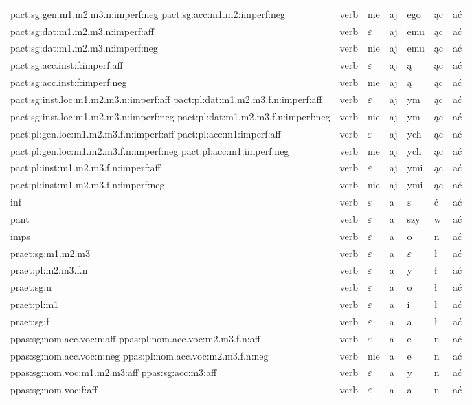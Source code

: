 \documentclass{article}
\begin{document}
\begin{longtable}{p{7cm}|l|l|l|l|l|l}
pact:sg:gen:m1.m2.m3.n:imperf:neg pact:sg:acc:m1.m2:imperf:neg & verb & nie & aj & ego & ąc & ać\\
pact:sg:dat:m1.m2.m3.n:imperf:aff & verb & $\varepsilon$ & aj & emu & ąc & ać\\
pact:sg:dat:m1.m2.m3.n:imperf:neg & verb & nie & aj & emu & ąc & ać\\
pact:sg:acc.inst:f:imperf:aff & verb & $\varepsilon$ & aj & ą & ąc & ać\\
pact:sg:acc.inst:f:imperf:neg & verb & nie & aj & ą & ąc & ać\\
pact:sg:inst.loc:m1.m2.m3.n:imperf:aff pact:pl:dat:m1.m2.m3.f.n:imperf:aff & verb & $\varepsilon$ & aj & ym & ąc & ać\\
pact:sg:inst.loc:m1.m2.m3.n:imperf:neg pact:pl:dat:m1.m2.m3.f.n:imperf:neg & verb & nie & aj & ym & ąc & ać\\
pact:pl:gen.loc:m1.m2.m3.f.n:imperf:aff pact:pl:acc:m1:imperf:aff & verb & $\varepsilon$ & aj & ych & ąc & ać\\
pact:pl:gen.loc:m1.m2.m3.f.n:imperf:neg pact:pl:acc:m1:imperf:neg & verb & nie & aj & ych & ąc & ać\\
pact:pl:inst:m1.m2.m3.f.n:imperf:aff & verb & $\varepsilon$ & aj & ymi & ąc & ać\\
pact:pl:inst:m1.m2.m3.f.n:imperf:neg & verb & nie & aj & ymi & ąc & ać\\
inf & verb & $\varepsilon$ & a & $\varepsilon$ & ć & ać\\
pant & verb & $\varepsilon$ & a & szy & w & ać\\
imps & verb & $\varepsilon$ & a & o & n & ać\\
praet:sg:m1.m2.m3 & verb & $\varepsilon$ & a & $\varepsilon$ & ł & ać\\
praet:pl:m2.m3.f.n & verb & $\varepsilon$ & a & y & ł & ać\\
praet:sg:n & verb & $\varepsilon$ & a & o & ł & ać\\
praet:pl:m1 & verb & $\varepsilon$ & a & i & ł & ać\\
praet:sg:f & verb & $\varepsilon$ & a & a & ł & ać\\
ppas:sg:nom.acc.voc:n:aff ppas:pl:nom.acc.voc:m2.m3.f.n:aff & verb & $\varepsilon$ & a & e & n & ać\\
ppas:sg:nom.acc.voc:n:neg ppas:pl:nom.acc.voc:m2.m3.f.n:neg & verb & nie & a & e & n & ać\\
ppas:sg:nom.voc:m1.m2.m3:aff ppas:sg:acc:m3:aff & verb & $\varepsilon$ & a & y & n & ać\\
ppas:sg:nom.voc:f:aff & verb & $\varepsilon$ & a & a & n & ać\\

\end{longtable}
\end{document}
